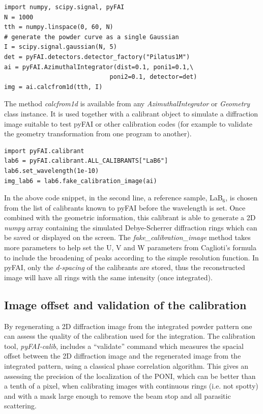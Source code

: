 \documentclass{iucr}
\begin{document}
\begin{verbatim}
import numpy, scipy.signal, pyFAI
N = 1000 
tth = numpy.linspace(0, 60, N)
# generate the powder curve as a single Gaussian
I = scipy.signal.gaussian(N, 5)
det = pyFAI.detectors.detector_factory("Pilatus1M")
ai = pyFAI.AzimuthalIntegrator(dist=0.1, poni1=0.1,\
                             poni2=0.1, detector=det)
img = ai.calcfrom1d(tth, I)
\end{verbatim}


The method \textit{calcfrom1d} is available from any
\textit{AzimuthalIntegrator} or \textit{Geometry} class instance.
It is used together with a calibrant object to simulate a diffraction
image suitable to test pyFAI or other calibration codes (for example to
validate the geometry transformation from one program to another).



\begin{verbatim}
import pyFAI.calibrant
lab6 = pyFAI.calibrant.ALL_CALIBRANTS["LaB6"]
lab6.set_wavelength(1e-10)
img_lab6 = lab6.fake_calibration_image(ai)
\end{verbatim}

In the above code snippet, in the second line, a reference sample,
LaB$_6$, is chosen from the list of calibrants known to pyFAI before the
wavelength is set.
Once combined with the geometric information, this calibrant is able to
generate a 2D \textit{numpy} array containing the simulated Debye-Scherrer
diffraction rings which can be saved or displayed on the screen.
The \textit{fake\_calibration\_image} method takes more parameters to help set
the U, V and W parameters from Caglioti's formula \cite{caglioti} to include the
broadening of peaks according to the simple resolution function.
In pyFAI, only the \textit{d-spacing} of the calibrants are stored, thus the
reconstructed image will have all rings with the same intensity (once integrated).

\subsection{Image offset and validation of the calibration}
By regenerating a 2D diffraction image from the integrated powder pattern one
can assess the quality of the calibration used for the integration.
The calibration tool, \textit{pyFAI-calib}, includes  a ``validate'' command
which measures the spacial offset between the 2D diffraction image and the
regenerated image from the integrated pattern, using a classical phase
correlation algorithm.
This gives an assessing the precision of the localization of the PONI, which
can be better than a tenth of a pixel, when calibrating images with continuous
rings (i.e. not spotty) and with a mask large enough to remove the beam stop and
all parasitic scattering.
\end{document}
